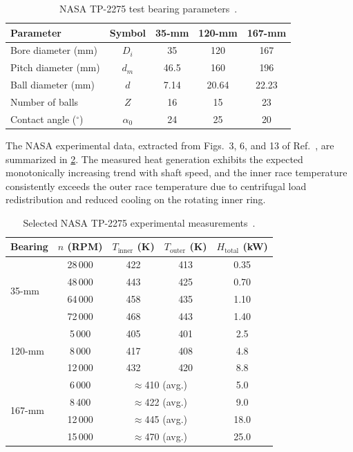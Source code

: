 \documentclass[preprint,12pt]{elsarticle}
\begin{document}
\begin{table}[htbp]
    \centering
    \caption{NASA TP-2275 test bearing parameters~\cite{Parker1984}.}
    \label{tab:nasa_geometry}
    \begin{tabular}{@{}lcccc@{}}
        \toprule
        Parameter & Symbol & 35-mm & 120-mm & 167-mm \\
        \midrule
        Bore diameter (mm) & $D_i$ & 35 & 120 & 167 \\
        Pitch diameter (mm) & $d_m$ & 46.5 & 160 & 196 \\
        Ball diameter (mm) & $d$ & 7.14 & 20.64 & 22.23 \\
        Number of balls & $Z$ & 16 & 15 & 23 \\
        Contact angle (${}^\circ$) & $\alpha_0$ & 24 & 25 & 20 \\
        \bottomrule
    \end{tabular}
\end{table}

The NASA experimental data, extracted from Figs.~3, 6, and 13 of Ref.~\cite{Parker1984}, are summarized in \cref{tab:nasa_thermal}. The measured heat generation exhibits the expected monotonically increasing trend with shaft speed, and the inner race temperature consistently exceeds the outer race temperature due to centrifugal load redistribution and reduced cooling on the rotating inner ring.

\begin{table}[htbp]
    \centering
    \caption{Selected NASA TP-2275 experimental measurements~\cite{Parker1984}.}
    \label{tab:nasa_thermal}
    \begin{tabular}{@{}lcccc@{}}
        \toprule
        Bearing & $n$ (RPM) & $T_{\text{inner}}$ (K) & $T_{\text{outer}}$ (K) & $H_{\text{total}}$ (kW) \\
        \midrule
        \multirow{4}{*}{35-mm} & 28\,000 & 422 & 413 & 0.35 \\
        & 48\,000 & 443 & 425 & 0.70 \\
        & 64\,000 & 458 & 435 & 1.10 \\
        & 72\,000 & 468 & 443 & 1.40 \\
        \midrule
        \multirow{3}{*}{120-mm} & 5\,000 & 405 & 401 & 2.5 \\
        & 8\,000 & 417 & 408 & 4.8 \\
        & 12\,000 & 432 & 420 & 8.8 \\
        \midrule
        \multirow{4}{*}{167-mm} & 6\,000 & \multicolumn{2}{c}{$\approx$410 (avg.)} & 5.0 \\
        & 8\,400 & \multicolumn{2}{c}{$\approx$422 (avg.)} & 9.0 \\
        & 12\,000 & \multicolumn{2}{c}{$\approx$445 (avg.)} & 18.0 \\
        & 15\,000 & \multicolumn{2}{c}{$\approx$470 (avg.)} & 25.0 \\
        \bottomrule
    \end{tabular}
\end{table}
\end{document}
